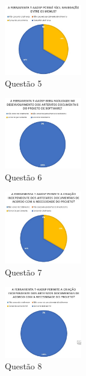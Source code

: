 \documentclass{acm_proc_article-sp}
\begin{document}
\begin{figure}[!htb]
\centering %
\includegraphics[width=0.3\textwidth]{AV_5.jpg} %
\caption{Questão 5}
\end{figure}

\begin{figure}[!htb]
\centering %
\includegraphics[width=0.3\textwidth]{AV_6.jpg} %
\caption{Questão 6}
\end{figure}

\begin{figure}[!htb]
\centering %
\includegraphics[width=0.3\textwidth]{AV_7.jpg} %
\caption{Questão 7}
\end{figure}

\begin{figure}[!htb]
\centering %
\includegraphics[width=0.3\textwidth]{AV_8.jpg} %
\caption{Questão 8}
\end{figure}
\end{document}
